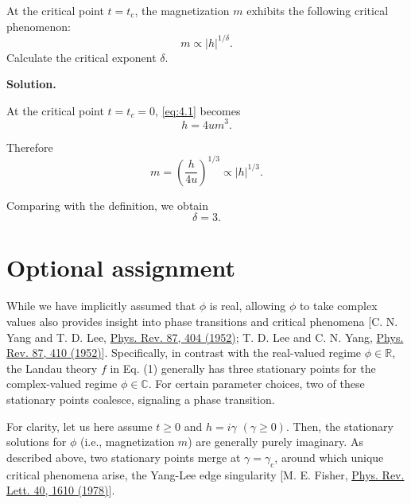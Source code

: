 \documentclass[11pt,a4paper]{article}
\newcounter{problem}
\newcounter{saveequation}
\newenvironment{solution}
{
	\par
	\setcounter{saveequation}{\value{equation}}
	\begingroup
	\setcounter{equation}{0}
	\renewcommand{\theequation}{\arabic{problem}.\arabic{equation}}
	\renewcommand{\theHequation}{sol.\arabic{problem}.\arabic{equation}}
	\noindent\textbf{Solution.}\quad
}
{
	\par
	\endgroup
	\setcounter{equation}{\value{saveequation}}
}
\begin{document}
	\begin{problembox}
		At the critical point $t = t_{\mathrm c}$, the magnetization $m$ exhibits the following critical phenomenon:
		\begin{equation}
			m \propto |h|^{1/\delta}.
			\tag{5}
		\end{equation}
		Calculate the critical exponent $\delta$.
	\end{problembox}
	\begin{solution}
		At the critical point $t=t_c=0$, \eqref{eq:4.1} becomes
		\begin{equation}
			h=4um^3.
		\end{equation}
		
		Therefore
		\begin{equation}
			m=\left(\frac{h}{4u}\right)^{1/3}\propto |h|^{1/3}.
		\end{equation}
		
	\begin{finalanswer}
		Comparing with the definition, we obtain
		\begin{equation}
			\label{fin:5}
			\delta=3.
		\end{equation}
	\end{finalanswer}
	\end{solution}
	
	\section*{Optional assignment}
	\begin{backgroundmatter}
		While we have implicitly assumed that $\phi$ is real, allowing $\phi$ to take complex values also provides insight into phase transitions and critical phenomena [C. N. Yang and T. D. Lee, \href{https://doi.org/10.1103/PhysRev.87.404}{Phys. Rev. 87, 404 (1952)}; T. D. Lee and C. N. Yang, \href{https://doi.org/10.1103/PhysRev.87.410}{Phys. Rev. 87, 410 (1952)}]. Specifically, in contrast with the real-valued regime $\phi \in \mathbb{R}$, the Landau theory $f$ in Eq. (1) generally has three stationary points for the complex-valued regime $\phi \in \mathbb{C}$. For certain parameter choices, two of these stationary points coalesce, signaling a phase transition.
		
		For clarity, let us here assume $t \ge 0$ and $h = i\gamma$ $(\gamma \ge 0)$. Then, the stationary solutions for $\phi$ (i.e., magnetization $m$) are generally purely imaginary. As described above, two stationary points merge at $\gamma = \gamma_{\mathrm c}$, around which unique critical phenomena arise, the Yang-Lee edge singularity [M. E. Fisher, \href{https://doi.org/10.1103/PhysRevLett.40.1610}{Phys. Rev. Lett. 40, 1610 (1978)}].
	\end{backgroundmatter}
	
\end{document}
